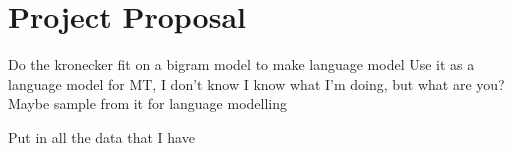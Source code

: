 \documentclass[12pt]{article}
\begin{document}
\section{Project Proposal}
Do the kronecker fit on a bigram model to make language model
Use it as a language model for MT, I don't know
I know what I'm doing, but what are you?
Maybe sample from it for language modelling

Put in all the data that I have
\end{document}
